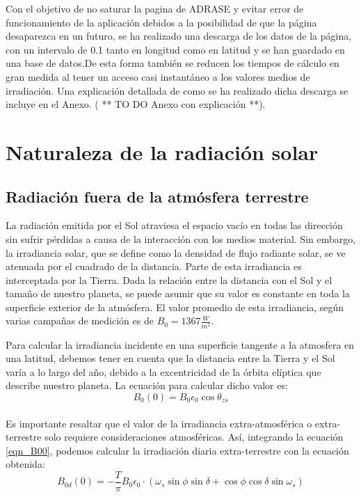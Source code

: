 Con el objetivo de no saturar la pagina de ADRASE y evitar error de funcionamiento de la aplicación debidos a la posibilidad de que la página desaparezca en un futuro, se ha realizado una descarga de los datos de la página, con un intervalo de 0.1 tanto en longitud como en latitud y se han guardado en una base de datos.De esta forma también se reducen los tiempos de cálculo en gran medida al tener un acceso casi instantáneo a los valores medios de irradiación. 
Una explicación detallada de como se ha realizado dicha descarga se incluye en el Anexo. ( ** TO DO Anexo con explicación **).
\newpage

\section{Naturaleza de la radiación solar}

\subsection{Radiación fuera de la atmósfera terrestre}
La radiación emitida por el Sol atraviesa el espacio vacío en todas las dirección sin sufrir pérdidas a causa de la interacción con los medios material. Sin embargo, la irradiancia solar, que se define como la densidad de flujo radiante solar, se ve atenuada por el cuadrado de la distancia. Parte de esta irradiancia es interceptada por la Tierra. Dada la relación entre la distancia con el Sol y el tamaño de nuestro planeta, se puede asumir que su valor es constante en toda la superficie exterior de la atmósfera. El valor promedio de esta irradiancia, según varias campañas de medición es de $B_{0} = 1367 \frac{W}{m^2}$.

Para calcular la irradiancia incidente en una superficie tangente a la atmosfera en una latitud, debemos tener en cuenta que la distancia entre la Tierra y el Sol varía a lo largo del año, debido a la excentricidad de la órbita elíptica que describe nuestro planeta. La ecuación para calcular dicho valor es:\\
\begin{equation}\label{eqn_B00}
B_0(0) = B_0\epsilon_0\cos\theta_{zs}
\end{equation}\\


Es importante resaltar que el valor de la irradiancia extra-atmosférica o extra-terrestre solo requiere consideraciones atmosféricas. Así, integrando la ecuación \ref{eqn_B00}, podemos calcular la irradiación diaria extra-terrestre con la ecuación obtenida:\\
\begin{equation}\label{eqn_B0d0}
B_{0d}(0)=-\frac{T}{\pi}B_0\epsilon_0·(\omega_s\sin\phi\sin\delta + \cos\phi\cos\delta\sin\omega_s)
\end{equation}\\


